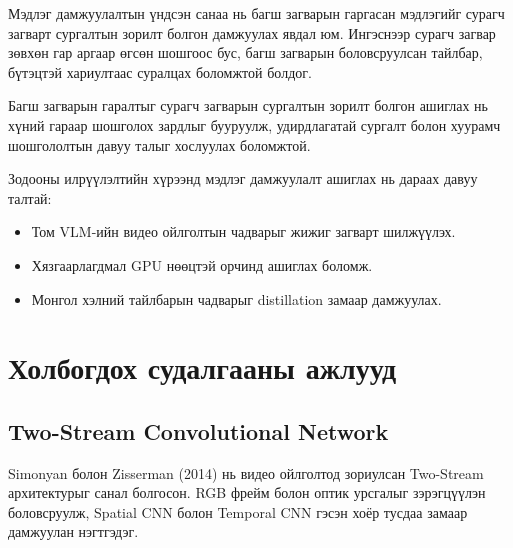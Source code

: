 Мэдлэг дамжуулалтын үндсэн санаа нь багш загварын гаргасан мэдлэгийг сурагч загварт сургалтын зорилт болгон дамжуулах явдал юм. Ингэснээр сурагч загвар зөвхөн гар аргаар өгсөн шошгоос бус, багш загварын боловсруулсан тайлбар, бүтэцтэй хариултаас суралцах боломжтой болдог.

Багш загварын гаралтыг сурагч загварын сургалтын зорилт болгон ашиглах нь хүний гараар шошголох зардлыг бууруулж, удирдлагатай сургалт болон хуурамч шошгололтын давуу талыг хослуулах боломжтой.

Зодооны илрүүлэлтийн хүрээнд мэдлэг дамжуулалт ашиглах нь дараах давуу талтай:
\begin{itemize}
    \item Том VLM-ийн видео ойлголтын чадварыг жижиг загварт шилжүүлэх.
    \item Хязгаарлагдмал GPU нөөцтэй орчинд ашиглах боломж.
    \item Монгол хэлний тайлбарын чадварыг distillation замаар дамжуулах.
\end{itemize}

\section{Холбогдох судалгааны ажлууд}

\subsection*{Two-Stream Convolutional Network}

Simonyan болон Zisserman (2014) нь видео ойлголтод зориулсан Two-Stream архитектурыг санал болгосон.
RGB фрейм болон оптик урсгалыг зэрэгцүүлэн боловсруулж, Spatial CNN болон Temporal CNN гэсэн
хоёр тусдаа замаар дамжуулан нэгтгэдэг.

